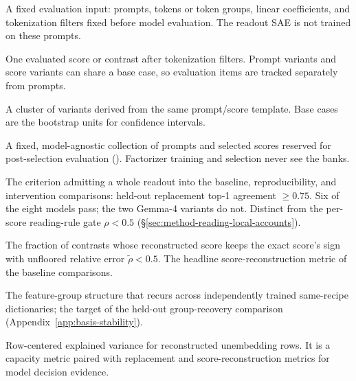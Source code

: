 \begin{description}[leftmargin=0.28\linewidth,style=nextline]
    \item[Evaluation set]
    A fixed evaluation input: prompts, tokens or token groups, linear
    coefficients, and tokenization filters fixed before model evaluation. The
    readout SAE is not trained on these prompts.

    \item[Evaluation item]
    One evaluated score or contrast after tokenization filters. Prompt variants and
    score variants can share a base case, so evaluation items are tracked
    separately from prompts.

    \item[Base case]
    A cluster of variants derived from the same prompt/score template. Base
    cases are the bootstrap units for confidence intervals.

    \item[Contrast bank]
    A fixed, model-agnostic collection of prompts and selected scores
    reserved for post-selection evaluation
    (). Factorizer training and selection
    never see the banks.

    \item[Interpretation gate (model-level)]
    The criterion admitting a whole readout into the baseline,
    reproducibility, and intervention comparisons: held-out replacement
    top-1 agreement \(\ge 0.75\). Six of the eight models pass; the two
    Gemma-4 variants do not. Distinct from the per-score reading-rule
    gate \(\rho<0.5\) (\S\ref{sec:method-reading-local-accounts}).

    \item[Sign-preserved low-error coverage]
    The fraction of contrasts whose reconstructed score keeps the exact
    score's sign with unfloored relative error \(\tilde\rho<0.5\). The
    headline score-reconstruction metric of the baseline comparisons.

    \item[Reproducible grouping core]
    The feature-group structure that recurs across independently trained
    same-recipe dictionaries; the target of the held-out group-recovery
    comparison (Appendix~\ref{app:basis-stability}).

    \item[rowEV]
    Row-centered explained variance for reconstructed unembedding
    rows. It is a capacity metric paired with replacement and score-reconstruction
    metrics for model decision evidence.


\end{description}
